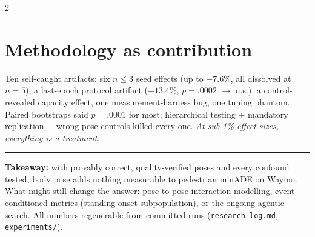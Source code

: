\documentclass[9pt,a4paper]{extarticle}
\begin{document}
\begin{multicols}{2}
\section{Methodology as contribution}
Ten self-caught artifacts: six $n{\leq}3$ seed effects (up to $-7.6\%$, all dissolved at $n{=}5$), a last-epoch protocol artifact ($+13.4\%$, $p{=}.0002$ $\to$ n.s.), a control-revealed capacity effect, one measurement-harness bug, one tuning phantom. Paired bootstraps said $p{=}.0001$ for most; hierarchical testing + mandatory replication + wrong-pose controls killed every one. \emph{At sub-1\% effect sizes, everything is a treatment.}

\end{multicols}

\vspace{2pt}\hrule\vspace{3pt}
{\footnotesize\textbf{Takeaway:} with provably correct, quality-verified poses and every confound tested, body pose adds nothing measurable to pedestrian minADE on Waymo. What might still change the answer: pose-to-pose interaction modelling, event-conditioned metrics (standing-onset subpopulation), or the ongoing agentic search. All numbers regenerable from committed runs (\texttt{research-log.md}, \texttt{experiments/}).}
\end{document}
